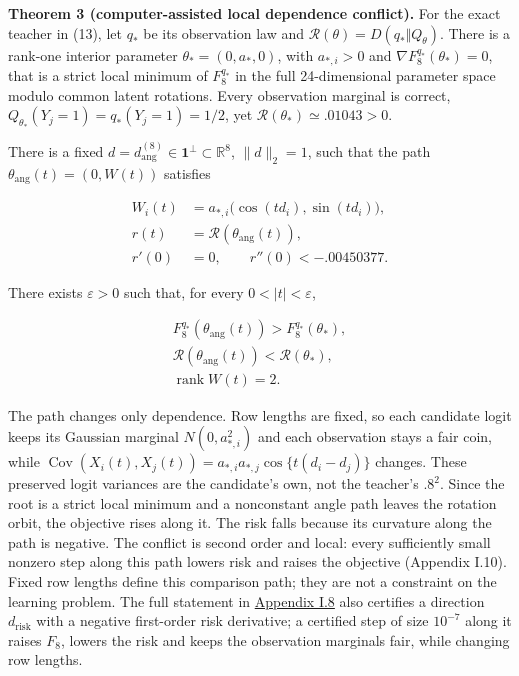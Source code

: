 \documentclass{article}
\begin{document}
\textbf{Theorem 3 (computer-assisted local dependence conflict).} For
the exact teacher in (13), let \(q_*\) be its observation law and
\(\mathcal R(\theta)=D(q_*\Vert Q_\theta)\). There is a rank-one
interior parameter \(\theta_*=(0,a_*,0)\), with \(a_{*,i}>0\) and
\(\nabla F_8^{q_*}(\theta_*)=0\), that is a strict local minimum of
\(F_8^{q_*}\) in the full 24-dimensional parameter space modulo common
latent rotations. Every observation marginal is correct,
\(Q_{\theta_*}(Y_j=1)=q_*(Y_j=1)=1/2\), yet
\(\mathcal R(\theta_*)\simeq.01043>0\).

There is a fixed
\(d=d_{\mathrm{ang}}^{(8)}\in\mathbf1^\perp\subset\mathbb R^8\),
\(\|d\|_2=1\), such that the path \(\theta_{\mathrm{ang}}(t)=(0,W(t))\)
satisfies

\[
\begin{aligned}
W_i(t)&=a_{*,i}\bigl(\cos(td_i),\sin(td_i)\bigr),\\
r(t)&=\mathcal R(\theta_{\mathrm{ang}}(t)),\\
r'(0)&=0,\qquad r''(0)<-.00450377.
\end{aligned}
\tag{14}
\]

There exists \(\varepsilon>0\) such that, for every
\(0<|t|<\varepsilon\),

\[
\begin{gathered}
F_8^{q_*}(\theta_{\mathrm{ang}}(t))>F_8^{q_*}(\theta_*),\\
\mathcal R(\theta_{\mathrm{ang}}(t))<\mathcal R(\theta_*),\\
\operatorname{rank}W(t)=2.
\end{gathered}
\tag{15}
\]

The path changes only dependence. Row lengths are fixed, so each
candidate logit keeps its Gaussian marginal \(N(0,a_{*,i}^2)\) and each
observation stays a fair coin, while
\(\operatorname{Cov}(X_i(t),X_j(t))=a_{*,i}a_{*,j}\cos\{t(d_i-d_j)\}\)
changes. These preserved logit variances are the candidate's own, not
the teacher's \(.8^2\). Since the root is a strict local minimum and a
nonconstant angle path leaves the rotation orbit, the objective rises
along it. The risk falls because its curvature along the path is
negative. The conflict is second order and local: every sufficiently
small nonzero step along this path lowers risk and raises the objective
(Appendix I.10). Fixed row lengths define this comparison path; they are
not a constraint on the learning problem. The full statement in
\hyperref[full-local-statement]{Appendix I.8} also certifies a direction
\(d_{\mathrm{risk}}\) with a negative first-order risk derivative; a
certified step of size \(10^{-7}\) along it raises \(F_8\), lowers the
risk and keeps the observation marginals fair, while changing row
lengths.
\end{document}
